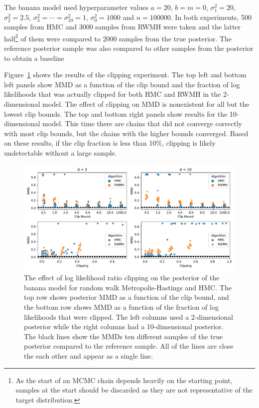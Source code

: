\documentclass[english,twoside,openright]{HYgraduMLDS}
\begin{document}
The banana model used hyperparameter values \(a = 20\), \(b = m = 0\), 
\(\sigma_1^2 = 20\), \(\sigma_2^2 = 2.5\), \(\sigma_3^2 = \dotsb = \sigma_{10}^2 = 1\),
\(\sigma_0^2 = 1000\) and \(n = 100000\).
In both experiments, 500 samples from HMC and 3000 samples from RWMH were taken
and the latter half\footnote{As the start of an MCMC chain depends heavily on the 
starting point, samples at the start should be discarded as they are not representative 
of the target distribution.} of them were
compared to 2000 samples from the true posterior. The reference posterior sample 
was also compared to other samples from the posterior to obtain a baseline 

Figure~\ref{clip_effect_fig} shows the results of the clipping experiment.
The top left and bottom left panels show MMD as a function of the clip bound 
and the fraction of log likelihoods that was actually clipped for both 
HMC and RWMH in the 2-dimensional model. The effect of clipping on MMD 
is nonexistent for all but the lowest clip bounds. The top and bottom right 
panels show results for the 10-dimensional model. This time there are chains 
that did not converge correctly with most clip bounds, but the chains with 
the higher bounds converged. Based on these results, if the clip fraction is 
less than 10\%, clipping is likely undetectable without a large sample.

\begin{figure}[h]
    \centering
    \includegraphics[width=\textwidth]{figures/clipping.pdf}
    \caption{
        The effect of log likelihood ratio clipping on the posterior of the 
        banana model for random walk Metropolis-Hastings and HMC.
        The top row shows posterior MMD as a function of the clip bound, and 
        the bottom row shows MMD as a function of the fraction of log likelihoods 
        that were clipped. The left columns used a 2-dimensional posterior 
        while the right columns had a 10-dimensional posterior. 
        The black lines show the MMDs ten different samples of the true posterior
        compared to the reference sample. All of the lines are close the each 
        other and appear as a single line.
    }
    \label{clip_effect_fig}
\end{figure}
\end{document}
